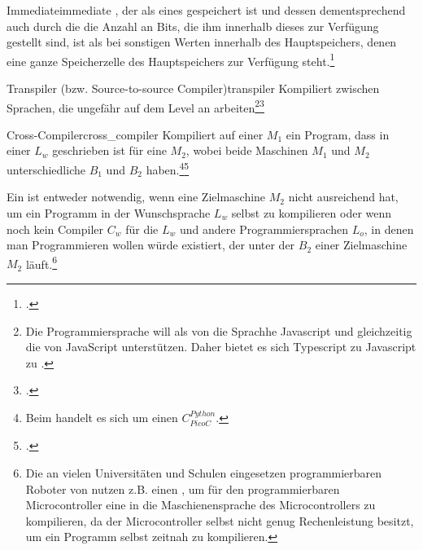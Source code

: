 \begin{Definition}{Immediate}{immediate}
  , der als  eines  gespeichert ist und dessen  dementsprechend auch durch die die Anzahl an Bits, die ihm innerhalb dieses  zur Verfügung gestellt sind,  ist als bei sonstigen Werten innerhalb des Hauptspeichers, denen eine ganze Speicherzelle des Hauptspeichers zur Verfügung steht.\footcite{ljohhuh_what_2018}
\end{Definition}

\begin{Definition}{Transpiler (bzw. Source-to-source Compiler)}{transpiler}
  Kompiliert zwischen Sprachen, die ungefähr auf dem  Level an  arbeiten\footnote{Die Programmiersprache  will als  von  die Sprachhe Javascript  und gleichzeitig die  von JavaScript unterstützen. Daher bietet es sich Typescript zu Javascript zu .}\footcite{thiemann_compilerbau_2021}
\end{Definition}

\begin{Definition}{Cross-Compiler}{cross_compiler}
  Kompiliert auf einer  $M_1$ ein Program, dass in einer  $L_w$ geschrieben ist für eine  $M_2$, wobei beide Maschinen $M_1$ und $M_2$ unterschiedliche  $B_1$ und $B_2$ haben.\footnote{Beim  handelt es sich um einen  $C_{PicoC}^{Python}$.}\footcite{thiemann_compilerbau_2021}
\end{Definition}

Ein  ist entweder notwendig, wenn eine Zielmaschine $M_2$ nicht ausreichend  hat, um ein Programm in der Wunschsprache $L_w$ selbst  zu kompilieren oder wenn noch kein Compiler $C_w$ für die  $L_w$ und andere Programmiersprachen $L_o$, in denen man Programmieren wollen würde existiert, der unter der  $B_2$ einer Zielmaschine $M_2$ läuft.\footnote{Die an vielen Universitäten und Schulen eingesetzen programmierbaren Roboter von  nutzen z.B. einen , um für den programmierbaren Microcontroller eine  in die Maschienensprache des Microcontrollers zu kompilieren, da der Microcontroller selbst nicht genug Rechenleistung besitzt, um ein Programm selbst zeitnah zu kompilieren.}

